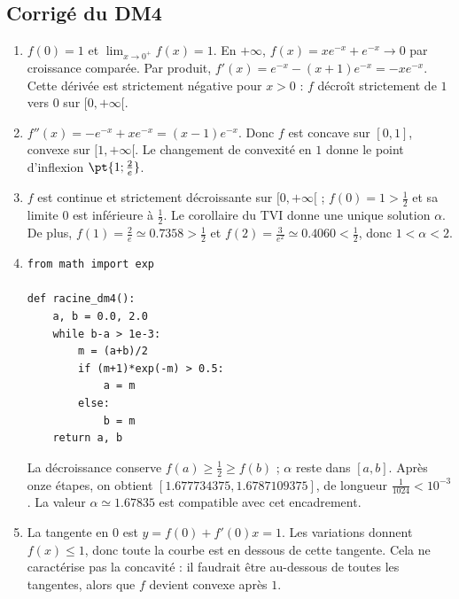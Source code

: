 \subsection{Corrigé du DM4}\begin{enumerate}
\item $f(0)=1$ et $\lim_{x\to0^+}f(x)=1$. En $+\infty$, $f(x)=xe^{-x}+e^{-x}\to0$ par croissance comparée. Par produit, $f'(x)=e^{-x}-(x+1)e^{-x}=-xe^{-x}$. Cette dérivée est strictement négative pour $x>0$ : $f$ décroît strictement de $1$ vers $0$ sur $[0,+\infty[$.
\item $f''(x)=-e^{-x}+xe^{-x}=(x-1)e^{-x}$. Donc $f$ est concave sur $[0,1]$, convexe sur $[1,+\infty[$. Le changement de convexité en $1$ donne le point d'inflexion $\pt{1;\frac{2}{e}}$.
\item $f$ est continue et strictement décroissante sur $[0,+\infty[$ ; $f(0)=1>\frac{1}{2}$ et sa limite $0$ est inférieure à $\frac{1}{2}$. Le corollaire du TVI donne une unique solution $\alpha$. De plus, $f(1)=\frac{2}{e}\simeq\num{0,7358}>\frac{1}{2}$ et $f(2)=\frac{3}{e^2}\simeq\num{0,4060}<\frac{1}{2}$, donc $1<\alpha<2$.
\item 
\begin{lstlisting}
from math import exp

def racine_dm4():
    a, b = 0.0, 2.0
    while b-a > 1e-3:
        m = (a+b)/2
        if (m+1)*exp(-m) > 0.5:
            a = m
        else:
            b = m
    return a, b
\end{lstlisting}
La décroissance conserve $f(a)\ge\frac{1}{2}\ge f(b)$ ; $\alpha$ reste dans $[a,b]$. Après onze étapes, on obtient $[\num{1,677734375},\num{1,6787109375}]$, de longueur $\frac{1}{1024}<10^{-3}$. La valeur $\alpha\simeq\num{1,67835}$ est compatible avec cet encadrement.
\item La tangente en $0$ est $y=f(0)+f'(0)x=1$. Les variations donnent $f(x)\le1$, donc toute la courbe est en dessous de cette tangente. Cela ne caractérise pas la concavité : il faudrait être au-dessous de toutes les tangentes, alors que $f$ devient convexe après $1$.
\end{enumerate}

\mxnewpage


